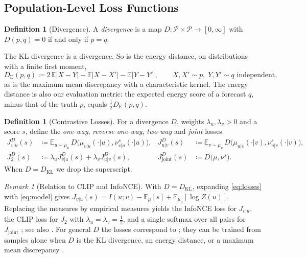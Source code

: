 \documentclass[11pt]{article}
\theoremstyle{plain}
\theoremstyle{definition}
\newtheorem{definition}[theorem]{Definition}
\theoremstyle{remark}
\newtheorem{remark}[theorem]{Remark}
\newcommand{\E}{\mathbb{E}}
\newcommand{\Prob}{\mathcal{P}}
\newcommand{\define}{\coloneqq}
\newcommand{\DE}{D_{\mathrm{E}}}
\newcommand{\abs}[1]{\left\lvert #1 \right\rvert}
\newcommand{\Jvu}{J_{v\vert u}}
\newcommand{\Juv}{J_{u\vert v}}
\newcommand{\Jtwo}{J_{2}}
\newcommand{\Jjoint}{J_{\mathrm{joint}}}
\begin{document}
\subsection{Population-Level Loss Functions}
\label{ssec:losses}

\begin{definition}[Divergence]
 \label{def:divergence}
 A \emph{divergence} is a map $D:\Prob\times\Prob\to[0,\infty]$ with
 $D(p,q)=0$ if and only if $p=q$.
\end{definition}

The KL divergence is a divergence. So is the energy distance, on
distributions with a finite first moment,
\begin{equation}
 \DE(p,q)\define2\,\E\abs{X-Y}-\E\abs{X-X'}-\E\abs{Y-Y'},
 \qquad X,X'\sim p,\;Y,Y'\sim q\text{ independent},
 \label{eq:energy}
\end{equation}
as is the maximum mean discrepancy with a characteristic kernel. The energy
distance is also our evaluation metric: the expected energy score
\cite{gneiting2007strictly} of a forecast $q$, minus that of the truth $p$,
equals $\tfrac12\DE(p,q)$.

\begin{definition}[Contrastive Losses]
 \label{def:losses}
 For a divergence $D$, weights $\lambda_u,\lambda_v>0$ and a score $s$,
 define the \emph{one-way}, \emph{reverse one-way}, \emph{two-way} and
 \emph{joint} losses
 \begin{equation}
  \begin{aligned}
   \Jvu^{D}(s)    & \define\E_{u\sim\mu_u}\,D\bigl(\mu_{v\vert u}(\cdot\vert u),\nu^{s}_{v\vert u}(\cdot\vert u)\bigr), &
   \Juv^{D}(s)    & \define\E_{v\sim\mu_v}\,D\bigl(\mu_{u\vert v}(\cdot\vert v),\nu^{s}_{u\vert v}(\cdot\vert v)\bigr),   \\
   \Jtwo^{D}(s)   & \define\lambda_u\Jvu^{D}(s)+\lambda_v\Juv^{D}(s),                                                    &
   \Jjoint^{D}(s) & \define D\bigl(\mu,\nu^{s}\bigr).
  \end{aligned}
  \label{eq:losses}
 \end{equation}
 When $D=D_{\mathrm{KL}}$ we drop the superscript.
\end{definition}

\begin{remark}[Relation to CLIP and InfoNCE]
 \label{rem:clip}
 With $D=D_{\mathrm{KL}}$, expanding \eqref{eq:losses} with \eqref{eq:model}
 gives $\Jvu(s)=I(u;v)-\E_{\mu}[s]+\E_{\mu_u}[\log Z(u)]$. Replacing the
 measures by empirical measures yields the InfoNCE loss for $\Jvu$, the CLIP
 loss for $\Jtwo$ with $\lambda_u=\lambda_v=\tfrac12$, and a single softmax
 over all pairs for $\Jjoint$
 \cite[Thm.~3.2, Thm.~3.8, Rem.~3.12]{baptista2025mathematical}; see also
 \cite[Sec.~2.2]{stuart2026expressivity}. For general $D$ the losses
 correspond to \cite[Opt.~Probs.~3.4 and 3.6]{baptista2025mathematical}; they
 can be trained from samples alone when $D$ is the KL divergence, an energy
 distance, or a maximum mean discrepancy
 \cite[Rem.~3.5]{baptista2025mathematical}.
\end{remark}
\end{document}
